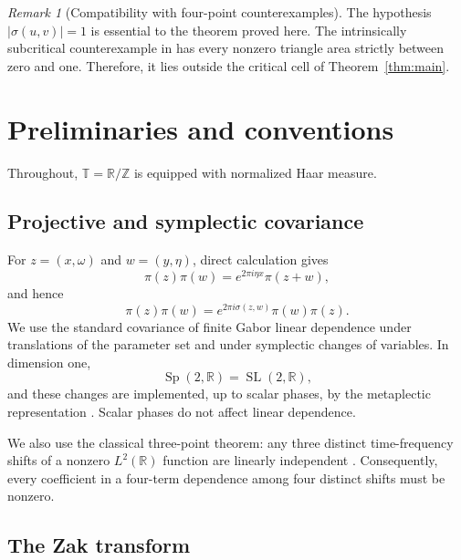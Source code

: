\documentclass[reqno]{amsart}
\theoremstyle{remark}
\newtheorem{remark}[theorem]{Remark}
\numberwithin{equation}{section}
\newcommand{\R}{\mathbb{R}}
\newcommand{\Z}{\mathbb{Z}}
\newcommand{\T}{\mathbb{T}}
\newcommand{\Sp}{\operatorname{Sp}}
\newcommand{\SL}{\operatorname{SL}}
\begin{document}
\begin{remark}[Compatibility with four-point counterexamples]
The hypothesis \(|\sigma(u,v)|=1\) is essential to the theorem proved here.
The intrinsically subcritical counterexample in \cite{OussaCounterexample}
has every nonzero triangle area strictly between zero and one. Therefore, it
lies outside the critical cell of Theorem~\ref{thm:main}.
\end{remark}

\section{Preliminaries and conventions}
\label{sec:preliminaries}

Throughout, \(\T=\R/\Z\) is equipped with normalized Haar measure.

\subsection{Projective and symplectic covariance}

For \(z=(x,\omega)\) and \(w=(y,\eta)\), direct calculation gives
\begin{equation}
  \pi(z)\pi(w)
  =e^{2\pi i\eta x}\pi(z+w),
  \label{eq:weyl-product}
\end{equation}
and hence
\begin{equation}
  \pi(z)\pi(w)
  =e^{2\pi i\sigma(z,w)}\pi(w)\pi(z).
  \label{eq:weyl-commutator}
\end{equation}
We use the standard covariance of finite Gabor linear dependence under
translations of the parameter set and under symplectic changes of variables.
In dimension one,
\[
  \Sp(2,\R)=\SL(2,\R),
\]
and these changes are implemented, up to scalar phases, by the metaplectic
representation \cite[Chapter~4]{Folland}. Scalar phases do not affect linear
dependence.

We also use the classical three-point theorem: any three distinct
time-frequency shifts of a nonzero \(L^2(\R)\) function are linearly
independent \cite{HRT,HeilSurvey}. Consequently, every coefficient in a
four-term dependence among four distinct shifts must be nonzero.

\subsection{The Zak transform}
\end{document}
